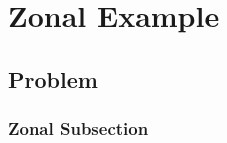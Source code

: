 \chapter{\label{ch:archetype zonal}Zonal Example}

\section{\label{sec:zonal problem}Problem}  %

\subsection{\label{ssec:zonal subsection}Zonal Subsection}  %


\endinput